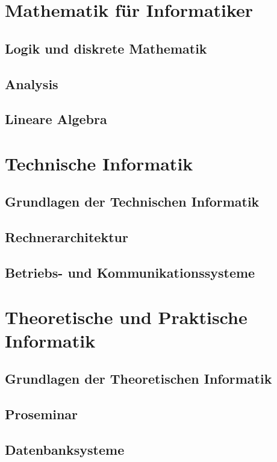 \part{Mathematik für Informatiker}
\chapter{Logik und diskrete Mathematik}

\chapter{Analysis}

\chapter{Lineare Algebra}



\part{Technische Informatik}
\chapter{Grundlagen der Technischen Informatik}
\chapter{Rechnerarchitektur}
\chapter{Betriebs- und Kommunikationssysteme}



\part{Theoretische und Praktische Informatik}
\chapter{Grundlagen der Theoretischen Informatik}

\chapter{Proseminar}
\chapter{Datenbanksysteme}

